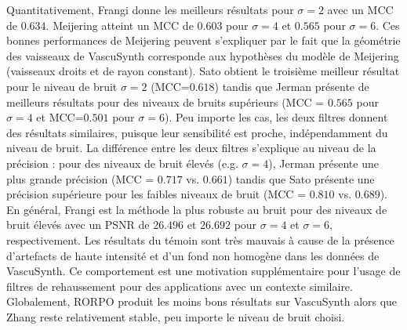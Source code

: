 Quantitativement, Frangi donne les meilleurs résultats pour $\sigma=2$ avec un MCC de $0.634$. Meijering  atteint un MCC de $0.603$ pour $\sigma=4$ et $0.565$ pour $\sigma=6$. Ces bonnes performances de Meijering peuvent s'expliquer par le fait que la géométrie des vaisseaux de VascuSynth corresponde aux hypothèses du modèle de Meijering (vaisseaux droits et de rayon constant). Sato obtient le troisième meilleur résultat pour le niveau de bruit $\sigma=2$ (MCC=$0.618$) tandis que Jerman présente de meilleurs résultats pour des niveaux de bruits supérieurs (MCC = $0.565$ pour $\sigma=4$ et MCC=$0.501$ pour $\sigma = 6$). Peu importe les cas, les deux filtres donnent des résultats similaires, puisque leur sensibilité est proche, indépendamment du niveau de bruit. La différence entre les deux filtres s'explique au niveau de la précision : pour des niveaux de bruit élevés (e.g. $\sigma=4$), Jerman présente une plus grande précision (MCC = $0.717$ vs. $0.661$) tandis que Sato présente une précision supérieure pour les faibles niveaux de bruit (MCC = $0.810$ vs. $0.689$). En général, Frangi est la méthode la plus robuste au bruit pour des niveaux de bruit élevés avec un PSNR de $26.496$ et $26.692$ pour $\sigma=4$ et $\sigma=6$, respectivement. Les résultats du témoin sont très mauvais à cause de la présence d'artefacts de haute intensité et d'un fond non homogène dans les données de VascuSynth. Ce comportement est une motivation supplémentaire pour l'usage de filtres de rehaussement pour des applications avec un contexte similaire. Globalement, RORPO produit les moins bons résultats sur VascuSynth alors que Zhang reste relativement stable, peu importe le niveau de bruit choisi.
